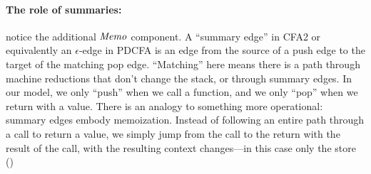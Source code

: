 \paragraph{The role of summaries:} notice the additional $\mathit{Memo}$ component.
%
A ``summary edge'' in CFA2 or equivalently an $\epsilon$-edge in PDCFA is an edge from the source of a push edge to the target of the matching pop edge.
%
``Matching'' here means there is a path through machine reductions that don't change the stack, or through summary edges.
%
In our model, we only ``push'' when we call a function, and we only ``pop'' when we return with a value.
%
There is an analogy to something more operational: summary edges embody memoization.
%
Instead of following an entire path through a call to return a value, we simply jump from the call to the return with the result of the call, with the resulting context changes---in this case only the store ()

